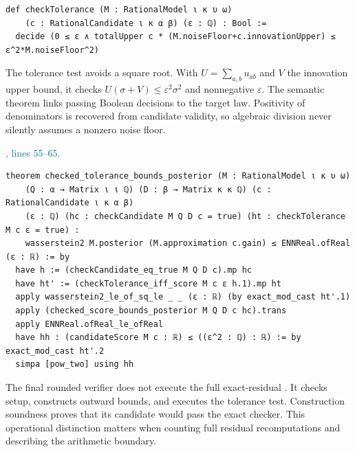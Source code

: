 \documentclass[11pt]{article}\usepackage{needspace}\renewcommand{\paperkind}{Lean companion}\setlength{\parskip}{0.35em}
\begin{document}
\begin{lstlisting}[style=BayesSource]
def checkTolerance (M : RationalModel ι κ υ ω)
    (c : RationalCandidate ι κ α β) (ε : ℚ) : Bool :=
  decide (0 ≤ ε ∧ totalUpper c * (M.noiseFloor+c.innovationUpper) ≤ ε^2*M.noiseFloor^2)
\end{lstlisting}

The tolerance test avoids a square root. With $U=\sum_{a,b}u_{ab}$ and $V$ the innovation upper bound, it checks $U(\sigma+V)\le\varepsilon^2\sigma^2$ and nonnegative $\varepsilon$. The semantic theorem links passing Boolean decisions to the target law. Positivity of denominators is recovered from candidate validity, so algebraic division never silently assumes a nonzero noise floor.



{\small\textcolor{teal}{, lines 55--65.}\par}

\begin{lstlisting}[style=BayesSource]
theorem checked_tolerance_bounds_posterior (M : RationalModel ι κ υ ω)
    (Q : α → Matrix ι ι ℚ) (D : β → Matrix κ κ ℚ) (c : RationalCandidate ι κ α β)
    (ε : ℚ) (hc : checkCandidate M Q D c = true) (ht : checkTolerance M c ε = true) :
    wasserstein2 M.posterior (M.approximation c.gain) ≤ ENNReal.ofReal (ε : ℝ) := by
  have h := (checkCandidate_eq_true M Q D c).mp hc
  have ht' := (checkTolerance_iff_score M c ε h.1).mp ht
  apply wasserstein2_le_of_sq_le _ _ (ε : ℝ) (by exact_mod_cast ht'.1)
  apply (checked_score_bounds_posterior M Q D c hc).trans
  apply ENNReal.ofReal_le_ofReal
  have hh : (candidateScore M c : ℝ) ≤ ((ε^2 : ℚ) : ℝ) := by exact_mod_cast ht'.2
  simpa [pow_two] using hh
\end{lstlisting}

The final rounded verifier does not execute the full exact-residual . It checks setup, constructs outward bounds, and executes the tolerance test. Construction soundness proves that its candidate would pass the exact checker. This operational distinction matters when counting full residual recomputations and describing the arithmetic boundary.
\end{document}

